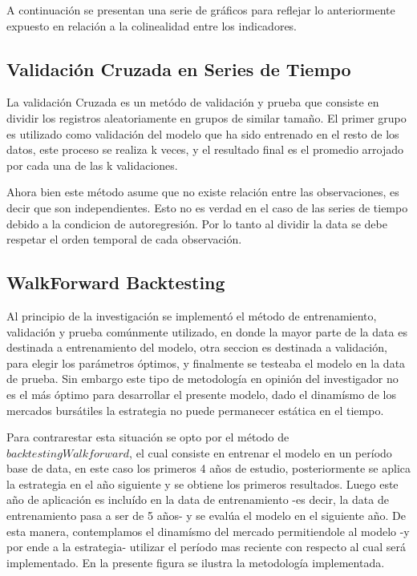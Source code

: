 \documentclass[a4paper,12pt]{Latex/Classes/PhDthesisPSnPDF}
\begin{document}
A continuación se presentan una serie de gráficos para reflejar lo anteriormente expuesto en relación a la colinealidad entre los indicadores.





\subsection{Validación Cruzada en Series de Tiempo}

La validación Cruzada es un metódo de validación y prueba que consiste en dividir los registros aleatoriamente en grupos de similar tamaño. El primer grupo es utilizado como validación del modelo que ha sido entrenado en el resto de los datos, este proceso se realiza k veces, y el resultado final es el promedio arrojado por cada una de las k validaciones.

Ahora bien este método asume que no existe relación entre las observaciones, es decir que son independientes. Esto no es verdad en el caso de las series de tiempo debido a la condicion de autoregresión. Por lo tanto al dividir la data se debe respetar el orden temporal de cada observación. 

\subsection{WalkForward Backtesting}

Al principio de la investigación se implementó el método de entrenamiento, validación y prueba comúnmente utilizado, en donde la mayor parte de la data es destinada a entrenamiento del modelo, otra seccion es destinada a validación, para elegir los parámetros óptimos, y finalmente se testeaba el modelo en la data de prueba. Sin embargo este tipo de metodología en opinión del investigador no es el más óptimo para desarrollar el presente modelo, dado el dinamísmo de los mercados bursátiles la estrategia no puede permanecer estática en el tiempo.

Para contrarestar esta situación se opto por el método de $backtesting Walkforward$, el cual consiste en entrenar el modelo en un período base de data, en este caso los primeros 4 años de estudio, posteriormente se aplica la estrategia en el año siguiente y se obtiene los primeros resultados. Luego este año de aplicación es incluído en la data de entrenamiento -es decir, la data de entrenamiento pasa a ser de 5 años- y se evalúa el modelo en el siguiente año. De esta manera, contemplamos el dinamísmo del mercado permitiendole al modelo -y por ende a la estrategia- utilizar el período mas reciente con respecto al cual será implementado. En la presente figura se ilustra la metodología implementada.
\end{document}
